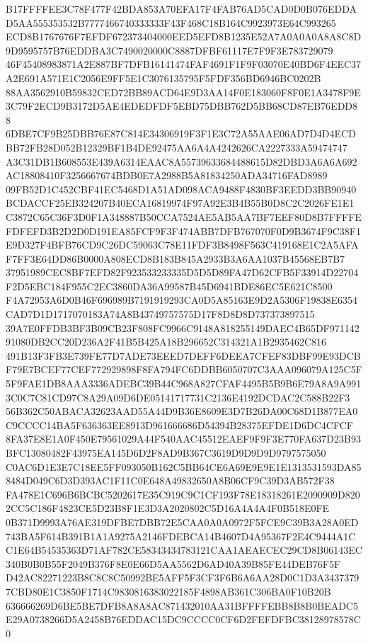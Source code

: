\documentclass[UTF8,fontset=fandol,zihao=-4,a4paper]{ctexart}
\begin{document}
{{B17FFFFEE3C78F477F42BDA853A70EFA17F4FAB76AD5CAD0D0B076EDDAD5AA555353532B7777466740333333F43F468C18B164C9923973E64C993265
ECD8B1767676F7EFDF672373404000EED5EFD8B1235E52A7A0A0A0A8A8C8D9D9595757B76EDDBA3C7490020000C8887DFBF61117E7F9F3E783729079
46F45408983871A2E887BF7DFB16141474FAF4691F1F9F03070E40BD6F4EEC37A2E691A571E1C2056E9FF5E1C3076135795F5FDF356BD6946BC0202B
88AA3562910B59832CED72BB89ACD64E9D3AA14F0E183060F8F0E1A3478F9E3C79F2ECD9B3172D5AE4EDEDFDF5EBD75DBB762D5BB68CD87EB76EDD88
6DBE7CF9B25DBB76E87C814E34306919F3F1E3C72A55AAE06AD7D4D4ECDBB72FB28D052B12329BF1B4DE92475AA6A4A4242626CA2227333A59474747
A3C31DB1B608553E439A6314EAAC8A55739633684488615D82DBD3A6A6A692AC18808410F3256667674BDB0E7A2988B5A81834250ADA34716FAD8989
09FB52D1C452CBF41EC5468D1A51AD098ACA9488F4830BF3EEDD3BB90940BCDACCF25EB324207B40ECA16819974F97A92E3B4B55B0D8C2C2026FE1E1
C3872C65C36F3D0F1A348887B50CCA7524AE5AB5AA7BF7EEF80D8B7FFFFEFDFEFD3B2D2D0D191EA85FCF9F3F474ABB7DFB767070F0D9B3674F9C38F1
E9D327F4BFB76CD9C26DC59063C78E11FDF3B8498F563C419168E1C2A5AFAF7FF3E64DD86B0000A808ECD8B183B845A2933B3A6AA1037B45568EB7B7
37951989CEC8BF7EFD82F923533233335D5D5D89FA47D62CFB5F33914D22704F2D5EBC184F955C2EC3860DA36A99587B45D6941BDE86EC5E621C8500
F4A72953A6D0B46F696989B7191919293CA0D5A85163E9D2A5306F19838E6354CAD7D1D1717070183A74A8B43749757575D17F8D8D8D737373897515
39A7E0FFDB3BF3B09CB23F808FC9966C9148A818255149DAEC4B65DF97114291080DB2CC20D236A2F41B5B425A18B296652C314321A1B2935462C816
491B13F3FB3E739FE77D7ADE73EEED7DEFF6DEEA7CFEF83DBF99E93DCBF79E7BCEF77CEF772929898F8FA794FC6DDBB6050707C3AAA096079A125C5F
5F9FAE1DB8AAA3336ADEBC39B44C968A827CFAF4495B5B9B6E79A8A9A9913C0C7C81CD97C8A29A09D6DE05141717731C2136E4192DCDAC2C588B22F3
56B362C50ABACA32623AAD55A44D9B36E8609E3D7B26DA00C68D1B877EA0C9CCCC14BA5F636363EE8913D961666686D54394B28375EFDE1D6DC4CFCF
8FA37E8E1A0F450E79561029A44F540AAC45512EAEF9F9F3E770FA637D23B93BFC13080482F43975EA145D6D2F8AD9B367C3619D9D9D9D9797575050
C0AC6D1E3E7C18EE5FF093050B162C5BB64CE6A69E9E9E1E1313531593DA858484D049C6D3D393AC1F11C0E648A49832650A8B06CF9C39D3AB572F38
FA478E1C696B6BCBC5202617E35C919C9C1CF193F78E18318261E2090909D8202CC5C186F4823CE5D23B8F1E3D3A2020802C5D16A4A4A4F0B518E0FE
0B371D9993A76AE319DFBE7DBB72E5CAA0A0A0972F5FCE9C39B3A28A0ED743BA5F614B391B1A1A9275A2146FDEBCA14B4607D4A95367F2E4C9444A1C
C1E64B54535363D71AF782CE58343434783121CAA1AEAECEC29CD8B06143EC340B0B0B55F2049B376F8E0E66D5AA5562D6AD40A39B85FE44DEB76F5F
D42AC82271223B8C8C8C50992BE5AFF5F3CF3F6B6A6AA28D0C1D3A34373797CBD80E1C3850F1714C9830816383022185F4898AB361C306BA0F10B20B
636666269D6BE5BE7DFB8A8A8AC871432010AA31BFFFFEBB8B8B0BEADC5E29A0738266D5A2458B76EDDAC15DC9CCCC0CF6D2FEFDFBC38128978578C0
}}
\end{document}
